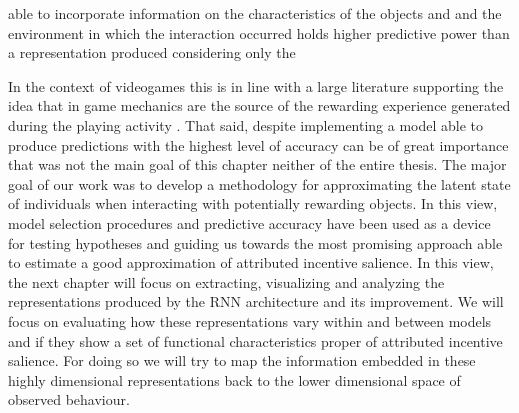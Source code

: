 able to incorporate information on the characteristics of the objects and and the environment in which the interaction occurred holds higher predictive power than a representation produced considering only the  


In the context of videogames this is in line with a large literature supporting the idea that in game mechanics are the source of the rewarding experience generated during the playing activity \cite{westwood2010role,king2010role,king2010video,yannakakis2013player,phillips2013videogame}. That said, despite implementing a model able to produce predictions with the highest level of accuracy can be of great importance that was not the main goal of this chapter neither of the entire thesis. The major goal of our work was to develop a methodology for approximating the latent state of individuals when interacting with potentially rewarding objects. In this view, model selection procedures and predictive accuracy have been used as a device for testing hypotheses and guiding us towards the most promising approach able to estimate a good approximation of attributed incentive salience. In this view, the next chapter will focus on extracting, visualizing and analyzing the representations produced by the RNN architecture and its improvement. We will focus on evaluating how these representations vary within and between models and if they show a set of functional characteristics proper of attributed incentive salience. For doing so we will try to map the information embedded in these highly dimensional representations back to the lower dimensional space of observed behaviour. 
